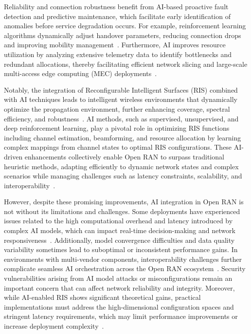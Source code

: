 \documentclass[sigconf]{acmart}
\begin{document}
Reliability and connection robustness benefit from AI-based proactive fault detection and predictive maintenance, which facilitate early identification of anomalies before service degradation occurs. For example, reinforcement learning algorithms dynamically adjust handover parameters, reducing connection drops and improving mobility management~\cite{ref54}. Furthermore, AI improves resource utilization by analyzing extensive telemetry data to identify bottlenecks and redundant allocations, thereby facilitating efficient network slicing and large-scale multi-access edge computing (MEC) deployments~\cite{ref49}.

Notably, the integration of Reconfigurable Intelligent Surfaces (RIS) combined with AI techniques leads to intelligent wireless environments that dynamically optimize the propagation environment, further enhancing coverage, spectral efficiency, and robustness~\cite{ref49}. AI methods, such as supervised, unsupervised, and deep reinforcement learning, play a pivotal role in optimizing RIS functions including channel estimation, beamforming, and resource allocation by learning complex mappings from channel states to optimal RIS configurations. These AI-driven enhancements collectively enable Open RAN to surpass traditional heuristic methods, adapting efficiently to dynamic network states and complex scenarios while managing challenges such as latency constraints, scalability, and interoperability~\cite{ref54}. 

However, despite these promising improvements, AI integration in Open RAN is not without its limitations and challenges. Some deployments have experienced issues related to the high computational overhead and latency introduced by complex AI models, which can impact real-time decision-making and network responsiveness~\cite{ref54}. Additionally, model convergence difficulties and data quality variability sometimes lead to suboptimal or inconsistent performance gains. In environments with multi-vendor components, interoperability challenges further complicate seamless AI orchestration across the Open RAN ecosystem~\cite{ref54}. Security vulnerabilities arising from AI model attacks or misconfigurations remain an important concern that can affect network reliability and integrity. Moreover, while AI-enabled RIS shows significant theoretical gains, practical implementations must address the high-dimensional configuration spaces and stringent latency requirements, which may limit performance improvements or increase deployment complexity~\cite{ref49}.
\end{document}

